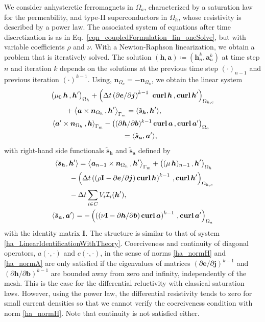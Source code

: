 \documentclass[journal]{IEEEtran}
\renewcommand{\vec}[1]{\boldsymbol{#1}} %
\newcommand{\mat}[1]{\mathbf{#1}} %
\newcommand{\paren}[1]{\left(#1\right)}
\newcommand{\parenangle}[1]{\left\langle#1\right\rangle}
\newcommand{\volInt}[3]{\paren{#1 \, , #2}_{#3}}
\newcommand{\volIntBig}[3]{\big(#1 \, , #2\big)_{#3}}
\newcommand{\surInt}[3]{\parenangle{#1 \, , #2}_{#3}}
\newcommand{\curl}{\text{\textbf{curl}}\, }
\newcommand{\Def}{\coloneqq}
\renewcommand{\b}{\vec b}
\renewcommand{\a}{\vec a}
\newcommand{\h}{\vec h}
\newcommand{\e}{\vec e}
\renewcommand{\j}{\vec j}
\newcommand{\Oa}{\Omega_a}
\newcommand{\Oh}{\Omega_h}
\newcommand{\Ohc}{\Omega_{h,\text{c}}}
\begin{document}
We consider anhysteretic ferromagnets in $\Oa$, characterized by a saturation law for the permeability, and type-II superconductors in $\Oh$, whose resistivity is described by a power law. The associated system of equations after time discretization is as in Eq.~\ref{eqn_coupledFormulation_lin_oneSolve}, but with variable coefficients $\rho$ and $\nu$. With a Newton-Raphson linearization, we obtain a problem that is iteratively solved. The solution $(\h,\a)\Def (\h_n^k,\a_n^k)$ at time step $n$ and iteration $k$ depends on the solutions at the previous time step $(\cdot)_{n-1}$ and previous iteration $(\cdot)^{k-1}$. Using, $\vec n_{\Oa} = - \vec n_{\Oh}$, we obtain the linear system
\begin{equation}\label{oneIterationHASystem}
\begin{aligned}
& \volIntBig{\mu_0\, \h}{\h'}{\Oh} + \volInt{\Delta t\paren{\partial\e/\partial\j}^{k-1}\  \curl \h}{\curl \h'}{\Ohc}\\
& \qquad  + \surInt{\a \times\vec n_{\Oh}}{\h'}{\Gamma_\text{m}} = \langle \tilde{\vec s}_{\h}, \h' \rangle,\\
& \surInt{\a'\times\vec n_{\Oh}}{\h}{\Gamma_\text{m}} - \volInt{(\partial \h/\partial \b)^{k-1}\, \curl \a}{\curl \a'}{\Oa}\\
& \qquad \qquad \qquad\qquad\qquad = \langle \tilde{\vec s}_{\a}, \a' \rangle,
\end{aligned}
\end{equation}
with right-hand side functionals $\tilde{\vec s}_{\h}$ and $\tilde{\vec s}_{\a}$ defined by
\begin{align}
\begin{aligned}
&\langle \tilde{\vec s}_{\h}, \h' \rangle = \surInt{\a_{n-1} \times\vec n_{\Oh}}{\h'}{\Gamma_\text{m}} + \volIntBig{(\mu\, \h)_{n-1}}{\h'}{\Oh}\\
&\qquad  - \volInt{\Delta t \paren{\paren{\rho \mat I - \partial\e/\partial\j} \curl \h}^{k-1}}{\curl \h'}{\Ohc}\\
&\qquad - \Delta t \sum_{i\in C} V_i \mathcal{I}_i(\h'),
\end{aligned}\\
\langle \tilde{\vec s}_{\a}, \a' \rangle = - \volInt{ \paren{\paren{\nu \mat I- \partial\h/\partial\b} \curl \a}^{k-1}}{\curl \a'}{\Oa}
\end{align}
with the identity matrix $\mat I$. The structure is similar to that of system \eqref{ha_LinearIdentificationWithTheory}. Coerciveness and continuity of diagonal operators, $a(\cdot,\cdot)$ and $c(\cdot,\cdot)$, in the sense of norms \eqref{ha_normH} and \eqref{ha_normA} are only satisfied if the eigenvalues of matrices $\paren{\partial\e/\partial\j}^{k-1}$ and $\paren{\partial\h/\partial\b}^{k-1}$ are bounded away from zero and infinity, independently of the mesh. This is the case for the differential reluctivity with classical saturation laws. However, using the power law, the differential resistivity tends to zero for small current densities so that we cannot verify the coerciveness condition with norm \eqref{ha_normH}. Note that continuity is not satisfied either.
\end{document}
